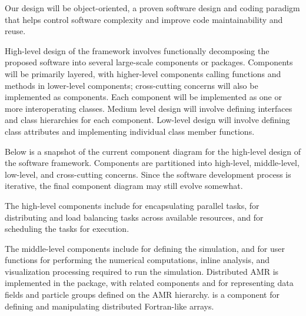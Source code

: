 \documentclass[10pt,twocolumn]{article}
\begin{document}
Our design will be object-oriented, a proven software design and
coding paradigm that helps control software complexity and improve
code maintainability and reuse.

High-level design of the framework involves functionally decomposing
the proposed software into several large-scale components or packages.
Components will be primarily layered, with higher-level components
calling functions and methods in lower-level components; cross-cutting
concerns will also be implemented as components.  Each component will
be implemented as one or more interoperating classes.  Medium level
design will involve defining interfaces and class hierarchies for each
component.  Low-level design will involve defining class attributes
and implementing individual class member functions.

Below is a snapshot of the current component diagram for the
high-level design of the software framework.  Components are
partitioned into high-level, middle-level, low-level, and
cross-cutting concerns.  Since the software development process is
iterative, the final component diagram may still evolve somewhat.



The high-level components include  for encapsulating
parallel tasks,  for distributing and load balancing
tasks across available resources, and  for scheduling
the tasks for execution.

The middle-level components include  for defining the
simulation, and  for user functions for
performing the numerical computations, inline analysis, and
visualization processing required to run the simulation.  Distributed
AMR is implemented in the  package, with related components
 and  for representing data fields and
particle groups defined on the AMR hierarchy.   is a
component for defining and manipulating distributed Fortran-like
arrays.
\end{document}
